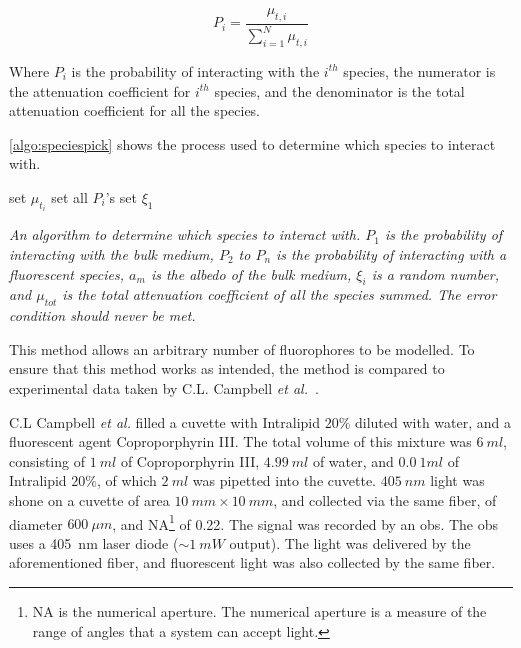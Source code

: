 \begin{equation}
P_i=\frac{\mu_{t,i}}{\sum\limits_{i=1}^{N} \mu_{t,i}}
\label{eqn:totspec}
\end{equation}

Where $P_i$ is the probability of interacting with the $i^{th}$ species, the numerator is the attenuation coefficient for $i^{th}$ species, and the denominator is the total attenuation coefficient for all the species.

\cref{algo:speciespick} shows the process used to determine which species to interact with.

\begin{center}
\begin{algorithm}[H]
\SetAlgoLined
  set $\mu_{t_{i}}$\;
  set all $P_i$'s\;
  set $\xi_1$\;
\
\caption{\textit{An algorithm to determine which species to interact with. $P_1$ is the probability of interacting with the bulk medium, $P_2$ to $P_n$ is the probability of interacting with a fluorescent species, $a_m$ is the albedo of the bulk medium, $\xi_i$ is a random number, and $\mu_{tot}$ is the total attenuation coefficient of all the species summed. The error condition should never be met.}}
\label{algo:speciespick}
\end{algorithm}
\end{center}

This method allows an arbitrary number of fluorophores to be modelled.
To ensure that this method works as intended, the method is compared to experimental data taken by C.L. Campbell \textit{et al.}~\cite{louisethesis}.

C.L Campbell \textit{et al.} filled a cuvette with Intralipid $20\%$ diluted with water, and a fluorescent agent Coproporphyrin III\@.
The total volume of this mixture was $6~ml$, consisting of $1~ml$ of Coproporphyrin III, $4.99~ml$ of water, and $0.0~1ml$ of Intralipid $20\%$, of which $2~ml$ was pipetted into the cuvette.
$405~nm$ light was shone on a cuvette of area $10~mm \times 10~mm$, and collected via the same fiber, of diameter $600~\mu m$, and NA\footnote{NA is the numerical aperture. The numerical aperture is a measure of the range of angles that a system can accept light.} of 0.22.
The signal was recorded by an \gls*{obs}.
The \gls*{obs} uses a 405~nm laser diode ($\sim1~mW$ output).
The light was delivered by the aforementioned fiber, and fluorescent light was also collected by the same fiber.


